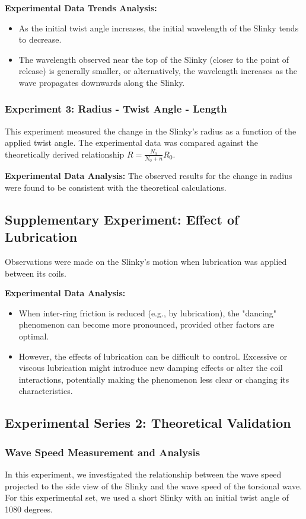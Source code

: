 \documentclass{mcmthesis}  %
\begin{document}
\textbf{Experimental Data Trends Analysis:}
\begin{itemize}
    \item As the initial twist angle increases, the initial wavelength of the Slinky tends to decrease.
    \item The wavelength observed near the top of the Slinky (closer to the point of release) is generally smaller, or alternatively, the wavelength increases as the wave propagates downwards along the Slinky.
\end{itemize}

\subsubsection{Experiment 3: Radius - Twist Angle - Length}
This experiment measured the change in the Slinky's radius as a function of the applied twist angle. The experimental data was compared against the theoretically derived relationship \(R = \frac{N_0}{N_0+n}R_0\).

\textbf{Experimental Data Analysis:} The observed results for the change in radius were found to be consistent with the theoretical calculations.

\subsection{Supplementary Experiment: Effect of Lubrication}
Observations were made on the Slinky's motion when lubrication was applied between its coils.

\textbf{Experimental Data Analysis:}
\begin{itemize}
    \item When inter-ring friction is reduced (e.g., by lubrication), the "dancing" phenomenon can become more pronounced, provided other factors are optimal.
    \item However, the effects of lubrication can be difficult to control. Excessive or viscous lubrication might introduce new damping effects or alter the coil interactions, potentially making the phenomenon less clear or changing its characteristics.
\end{itemize}

\subsection{Experimental Series 2: Theoretical Validation}

\subsubsection{Wave Speed Measurement and Analysis}
In this experiment, we investigated the relationship between the wave speed projected to the side view of the Slinky and the wave speed of the torsional wave. For this experimental set, we used a short Slinky with an initial twist angle of 1080 degrees.
\end{document}
